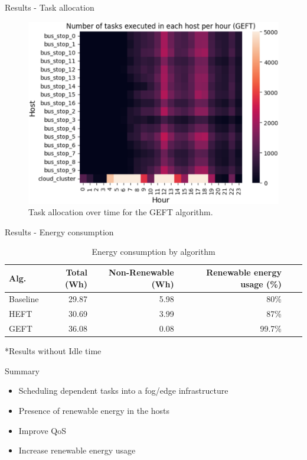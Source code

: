 \documentclass[Ligatures=TeX,table,svgnames,usetotalslideindicator,compress,10pt,aspectratio=169]{beamer}
\begin{document}
\begin{frame}{Results - Task allocation}

   \begin{figure}[!h]
        \centering
        \includegraphics[width=.7\linewidth]{images/GEFT.png}
        \caption{Task allocation over time for the GEFT algorithm.}
      \end{figure}

\end{frame}


\begin{frame}{Results - Energy consumption}

\begin{table}[h]
  
  \caption{Energy consumption by algorithm }\label{tab:dcutilization} \centering

  \begin{tabular}{|l|r|r|r|r|r|}
   \hline
    
   \textbf{Alg.} &   \textbf{Total (Wh)} & \textbf{Non-Renewable (Wh)} & \textbf{Renewable energy usage (\%)}\\
  \hline
  Baseline  & 29.87 & 5.98 &  80\% \\
  \hline
  HEFT  & 30.69 &  3.99 & 87\% \\
  \hline
  GEFT & 36.08 & 0.08  &    99.7\% \\
  \hline

\end{tabular}
\end{table}

*Results without Idle time

\end{frame}

\begin{frame}{Summary}

\begin{itemize}
    \item Scheduling dependent tasks into a fog/edge infrastructure
    \item Presence of renewable energy in the hosts
    \item Improve QoS
    \item Increase renewable energy usage
\end{itemize}
\end{frame}
\end{document}
